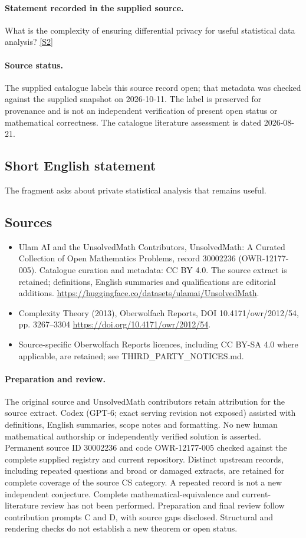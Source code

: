 \documentclass[11pt]{article}
\newcommand{\sref}[2]{\hyperlink{source:#1:#2}{[S#2]}}
\begin{document}
\paragraph{Statement recorded in the supplied source.}
What is the complexity of ensuring differential privacy for useful statistical data analysis? \sref{30002236}{2}
\paragraph{Source status.}
The supplied catalogue labels this source record open; that metadata was checked against the supplied snapshot on 2026-10-11. The label is preserved for provenance and is not an independent verification of present open status or mathematical correctness. The catalogue literature assessment is dated 2026-08-21.
\subsection{Short English statement}
The fragment asks about private statistical analysis that remains useful.
\subsection{Sources}
\begin{itemize}
\item[\hypertarget{source:30002236:1}{S1}] Ulam AI and the UnsolvedMath Contributors, UnsolvedMath: A Curated Collection of Open Mathematics Problems, record 30002236 (OWR-12177-005). Catalogue curation and metadata: CC BY 4.0. The source extract is retained; definitions, English summaries and qualifications are editorial additions.
\url{https://huggingface.co/datasets/ulamai/UnsolvedMath}.
\item[\hypertarget{source:30002236:2}{S2}] Complexity Theory (2013), Oberwolfach Reports, DOI 10.4171/owr/2012/54, pp. 3267--3304
\url{https://doi.org/10.4171/owr/2012/54}.
\item Source-specific Oberwolfach Reports licences, including CC BY-SA 4.0 where applicable, are retained; see THIRD\_PARTY\_NOTICES.md.
\end{itemize}
\paragraph{Preparation and review.}
The original source and UnsolvedMath contributors retain attribution for the source extract. Codex (GPT-6; exact serving revision not exposed) assisted with definitions, English summaries, scope notes and formatting. No new human mathematical authorship or independently verified solution is asserted. Permanent source ID 30002236 and code OWR-12177-005 checked against the complete supplied registry and current repository. Distinct upstream records, including repeated questions and broad or damaged extracts, are retained for complete coverage of the source CS category. A repeated record is not a new independent conjecture. Complete mathematical-equivalence and current-literature review has not been performed. Preparation and final review follow contribution prompts C and D, with source gaps disclosed. Structural and rendering checks do not establish a new theorem or open status.
\label{end:30002236}
\end{document}
